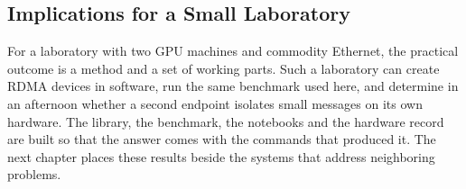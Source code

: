 \subsection{Implications for a Small Laboratory}

For a laboratory with two GPU machines and commodity Ethernet, the
practical outcome is a method and a set of working parts. Such a laboratory
can create RDMA devices in software, run the same benchmark used here, and determine in an afternoon whether a second endpoint isolates small messages on
its own hardware. The library, the benchmark, the notebooks and the hardware
record are built so that the answer comes with the commands that produced it.
The next chapter places these results beside the systems that address
neighboring problems.
